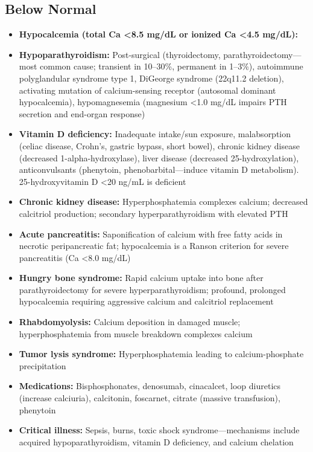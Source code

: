 \subsection*{Below Normal}
\begin{itemize}
  \item \textbf{Hypocalcemia (total Ca <8.5 mg/dL or ionized Ca <4.5 mg/dL):}
  \item \textbf{Hypoparathyroidism:} Post-surgical (thyroidectomy, parathyroidectomy---most common cause; transient in 10--30\%, permanent in 1--3\%), autoimmune polyglandular syndrome type 1, DiGeorge syndrome (22q11.2 deletion), activating mutation of calcium-sensing receptor (autosomal dominant hypocalcemia), hypomagnesemia (magnesium <1.0 mg/dL impairs PTH secretion and end-organ response)
  \item \textbf{Vitamin D deficiency:} Inadequate intake/sun exposure, malabsorption (celiac disease, Crohn's, gastric bypass, short bowel), chronic kidney disease (decreased 1-alpha-hydroxylase), liver disease (decreased 25-hydroxylation), anticonvulsants (phenytoin, phenobarbital---induce vitamin D metabolism). 25-hydroxyvitamin D <20 ng/mL is deficient
  \item \textbf{Chronic kidney disease:} Hyperphosphatemia complexes calcium; decreased calcitriol production; secondary hyperparathyroidism with elevated PTH
  \item \textbf{Acute pancreatitis:} Saponification of calcium with free fatty acids in necrotic peripancreatic fat; hypocalcemia is a Ranson criterion for severe pancreatitis (Ca <8.0 mg/dL)
  \item \textbf{Hungry bone syndrome:} Rapid calcium uptake into bone after parathyroidectomy for severe hyperparathyroidism; profound, prolonged hypocalcemia requiring aggressive calcium and calcitriol replacement
  \item \textbf{Rhabdomyolysis:} Calcium deposition in damaged muscle; hyperphosphatemia from muscle breakdown complexes calcium
  \item \textbf{Tumor lysis syndrome:} Hyperphosphatemia leading to calcium-phosphate precipitation
  \item \textbf{Medications:} Bisphosphonates, denosumab, cinacalcet, loop diuretics (increase calciuria), calcitonin, foscarnet, citrate (massive transfusion), phenytoin
  \item \textbf{Critical illness:} Sepsis, burns, toxic shock syndrome---mechanisms include acquired hypoparathyroidism, vitamin D deficiency, and calcium chelation
\end{itemize}

